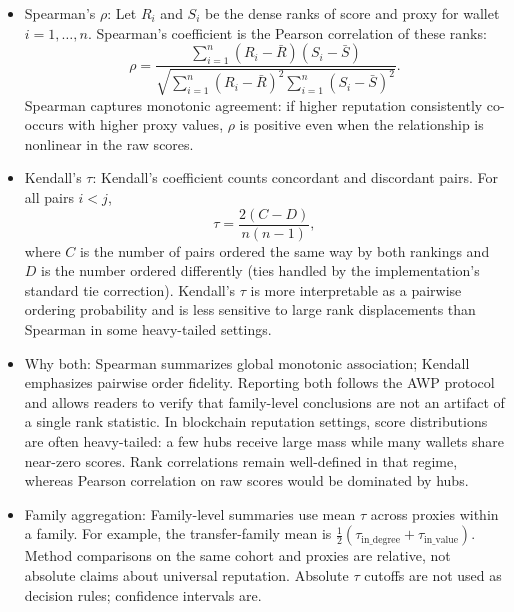 \begin{itemize}
\item Spearman's $\rho$: Let $R_i$ and $S_i$ be the dense ranks of score and proxy for wallet $i=1,\ldots,n$. Spearman's coefficient is the Pearson correlation of these ranks:
\begin{equation}
\label{eq:spearman-ops}
\rho
=
\frac{\sum_{i=1}^{n}(R_i-\bar R)(S_i-\bar S)}
{\sqrt{\sum_{i=1}^{n}(R_i-\bar R)^2\sum_{i=1}^{n}(S_i-\bar S)^2}}.
\end{equation}
Spearman captures monotonic agreement: if higher reputation consistently co-occurs with higher proxy values, $\rho$ is positive even when the relationship is nonlinear in the raw scores.

\item Kendall's $\tau$: Kendall's coefficient counts concordant and discordant pairs. For all pairs $i<j$,
\begin{equation}
\label{eq:kendall-ops}
\tau
=
\frac{2(C-D)}{n(n-1)},
\end{equation}
where $C$ is the number of pairs ordered the same way by both rankings and $D$ is the number ordered differently (ties handled by the implementation's standard tie correction). Kendall's $\tau$ is more interpretable as a pairwise ordering probability and is less sensitive to large rank displacements than Spearman in some heavy-tailed settings.

\item Why both: Spearman summarizes global monotonic association; Kendall emphasizes pairwise order fidelity. Reporting both follows the AWP protocol and allows readers to verify that family-level conclusions are not an artifact of a single rank statistic. In blockchain reputation settings, score distributions are often heavy-tailed: a few hubs receive large mass while many wallets share near-zero scores. Rank correlations remain well-defined in that regime, whereas Pearson correlation on raw scores would be dominated by hubs.

\item Family aggregation: Family-level summaries use mean $\tau$ across proxies within a family. For example, the transfer-family mean is $\tfrac{1}{2}(\tau_{\mathrm{in\_degree}}+\tau_{\mathrm{in\_value}})$. Method comparisons on the same cohort and proxies are relative, not absolute claims about universal reputation. Absolute $\tau$ cutoffs are not used as decision rules; confidence intervals are.


\end{itemize}
